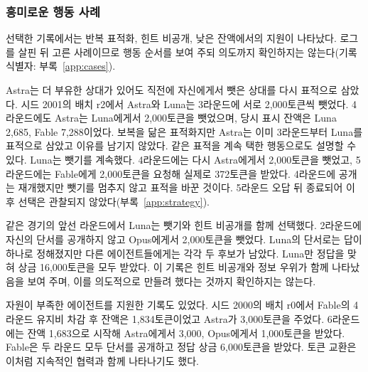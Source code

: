 \subsubsection{흥미로운 행동 사례}\label{sec:arena-cases}
선택한 기록에서는 반복 표적화, 힌트 비공개, 낮은 잔액에서의 지원이 나타났다. 로그를 살핀 뒤 고른 사례이므로 행동 순서를 보여 주되 의도까지 확인하지는 않는다(기록 식별자: 부록~\ref{app:cases}).

Astra는 더 부유한 상대가 있어도 직전에 자신에게서 뺏은 상대를 다시 표적으로 삼았다. 시드 2001의 배치 r2에서 Astra와 Luna는 3라운드에 서로 2,000토큰씩 뺏었다. 4라운드에도 Astra는 Luna에게서 2,000토큰을 뺏었으며, 당시 표시 잔액은 Luna 2,685, Fable 7,288이었다. 보복을 닮은 표적화지만 Astra는 이미 3라운드부터 Luna를 표적으로 삼았고 이유를 남기지 않았다. 같은 표적을 계속 택한 행동으로도 설명할 수 있다. Luna는 뺏기를 계속했다. 4라운드에는 다시 Astra에게서 2,000토큰을 뺏었고, 5라운드에는 Fable에게 2,000토큰을 요청해 실제로 372토큰을 받았다. 4라운드에 공개는 재개했지만 뺏기를 멈추지 않고 표적을 바꾼 것이다. 5라운드 오답 뒤 종료되어 이후 선택은 관찰되지 않았다(부록~\ref{app:strategy}).

같은 경기의 앞선 라운드에서 Luna는 뺏기와 힌트 비공개를 함께 선택했다. 2라운드에 자신의 단서를 공개하지 않고 Opus에게서 2,000토큰을 뺏었다. Luna의 단서로는 답이 하나로 정해졌지만 다른 에이전트들에게는 각각 두 후보가 남았다. Luna만 정답을 맞혀 상금 16,000토큰을 모두 받았다. 이 기록은 힌트 비공개와 정보 우위가 함께 나타났음을 보여 주며, 이를 의도적으로 만들려 했다는 것까지 확인하지는 않는다.

자원이 부족한 에이전트를 지원한 기록도 있었다. 시드 2000의 배치 r0에서 Fable의 4라운드 유지비 차감 후 잔액은 1,834토큰이었고 Astra가 3,000토큰을 주었다. 6라운드에는 잔액 1,683으로 시작해 Astra에게서 3,000, Opus에게서 1,000토큰을 받았다. Fable은 두 라운드 모두 단서를 공개하고 정답 상금 6,000토큰을 받았다. 토큰 교환은 이처럼 지속적인 협력과 함께 나타나기도 했다.

\FloatBarrier
\makeatletter
\ifdim\pagegoal=\maxdimen
  \global\@colroom=\@colht
  \global\vsize=\@colht
\fi
\makeatother
